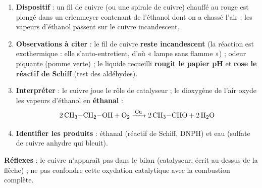\documentclass[11pt]{article}
\newcommand{\cle}[1]{{\popxbold\color{popdark}#1}}
\begin{document}
\begin{methode}
\begin{enumerate}
\item \textbf{Dispositif} : un fil de cuivre (ou une spirale de cuivre) chauffé au rouge est plongé dans un erlenmeyer contenant de l'éthanol dont on a chassé l'air ; les vapeurs d'éthanol passent sur le cuivre incandescent.
\item \textbf{Observations à citer} : le fil de cuivre \textbf{reste incandescent} (la réaction est exothermique : elle s'auto-entretient, d'où « lampe sans flamme ») ; odeur piquante (pomme verte) ; le liquide recueilli \textbf{rougit le papier pH} et \textbf{rose le réactif de Schiff} (test des aldéhydes).
\item \textbf{Interpréter} : le cuivre joue le rôle de \cle{catalyseur} ; le dioxygène de l'air oxyde les vapeurs d'éthanol en \textbf{éthanal} :
\[ \ce{2 CH3-CH2-OH + O2 ->[Cu] 2 CH3-CHO + 2 H2O} \]
\item \textbf{Identifier les produits} : éthanal (réactif de Schiff, DNPH) et eau (sulfate de cuivre anhydre qui bleuit).
\end{enumerate}
\textbf{Réflexes} : le cuivre n'apparaît pas dans le bilan (catalyseur, écrit au-dessus de la flèche) ; ne pas confondre cette oxydation catalytique avec la combustion complète.
\end{methode}
\end{document}
